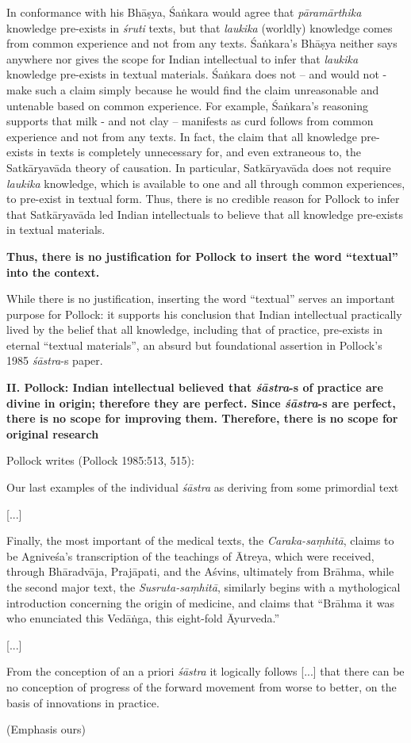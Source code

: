 In conformance with his Bhāṣya, Śaṅkara would agree that {\sl pāramārthika} knowledge pre-exists in {\sl śruti} texts, but that {\sl laukika} (worldly) knowledge comes from common experience and not from any texts. Śaṅ\-kara's Bhāṣya neither says anywhere nor gives the scope for Indian intellectual to infer that {\sl laukika} knowledge pre-exists in textual materials.  Śaṅkara does not -- and would not - make such a claim simply because he would find the claim unreasonable and untenable based on common experience. For example, Śaṅkara's reasoning supports that milk - and not clay -- manifests as curd follows from common experience and not from any texts. In fact, the claim that all knowledge pre-exists in texts is completely unnecessary for, and even extraneous to, the Satkāryavāda theory of causation. In particular, Satkāryavāda does not require {\sl laukika} knowledge, which is available to one and all through common experiences, to pre-exist in textual form. Thus, there is no credible reason for Pollock to infer that Satkāryavāda led Indian intellectuals to believe that all knowledge pre-exists in textual materials.

\textbf{Thus, there is no justification for Pollock to insert the word ``textual'' into the context.}

While there is no justification, inserting the word ``textual'' serves an important purpose for Pollock: it supports his conclusion that Indian intellectual practically lived by the belief that all knowledge, including that of practice, pre-exists in eternal ``textual materials'', an absurd but foundational assertion in Pollock's 1985 {\sl śāstra}-s paper.


{\bf II. Pollock: Indian intellectual believed that {{\sl\bfseries śāstra}\relax}-s of practice are divine in origin; therefore they are perfect. Since {{\sl\bfseries śāstra}\relax}-s are perfect, there is no scope for improving them. Therefore, there is no scope for original research}

Pollock writes (Pollock 1985:513, 515):
\begin{myquote}
Our last examples of the individual {\sl śāstra} as deriving from some primordial text 

[...]

Finally, the most important of the medical texts, the {\sl Caraka-saṃhitā}, claims to be Agniveśa's transcription of the teachings of Ātreya, which were received, through Bhāradvāja, Prajāpati, and the Aśvins, ultimately from Brāhma, while the second major text, the {\sl Susruta-saṃhitā}, similarly begins with a mythological introduction concerning the origin of medicine, and claims that ``Brāhma it was who enunciated this Vedāṅga, this eight-fold Āyurveda.''

[...]

From the conception of an a priori {\sl śāstra} it logically follows [...] that there can be no conception of progress of the forward movement from worse to better, on the basis of innovations in practice. 

\hfill (Emphasis ours)
\end{myquote}

